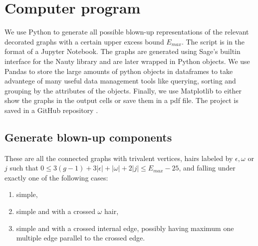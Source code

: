 \section{Computer program}


\newcommand{\myB}{\bGK^{12,1}}

We use Python to generate all possible blown-up representations of the relevant decorated graphs with a certain upper excess bound $E_{max}$. The script is in the format of a Jupyter Notebook. The graphs are generated using Sage's builtin interface for the Nauty library and are later wrapped in Python objects. We use Pandas to store the large amounts of python objects in dataframes to take advantege of many useful data management tools like querying, sorting and grouping by the attributes of the objects. Finally, we use Matplotlib to either show the graphs in the output cells or save them in a pdf file. The project is saved in a GitHub repository \cite{github}.

\subsection{Generate blown-up components} \label{subsec:genBlownup} These are all the connected graphs with trivalent vertices, hairs labeled by $\epsilon,\omega$ or $j$ such that $0\leq 3(g-1)+3|\epsilon|+|\omega|+2|j| \leq E_{max}-25$, and falling under exactly one of the following cases:
\begin{enumerate}
    \item simple,
    \item simple and with a crossed $\omega$ hair,
    \item simple and with a crossed internal edge, possibly having maximum one multiple edge parallel to the crossed edge.
\end{enumerate}

